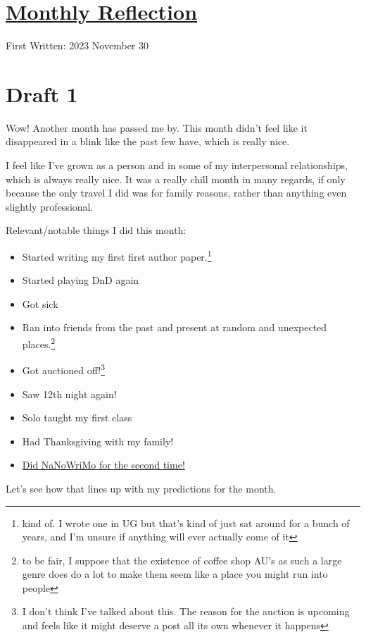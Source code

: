 \documentclass[12pt]{article}[titlepage]
\renewcommand{\,}{\textsuperscript{,}}
\begin{document}
\doublespacing
\section{\href{reflection-november-23.html}{Monthly Reflection}}
First Written: 2023 November 30

\section{Draft 1}
Wow!
Another month has passed me by.
This month didn't feel like it disappeared in a blink like the past few have, which is really nice.
 
I feel like I've grown as a person and in some of my interpersonal relationships, which is always really nice.
It was a really chill month in many regards, if only because the only travel I did was for family reasons, rather than anything even slightly professional.
 
Relevant/notable things I did this month:
\begin{itemize}
\item Started writing my first first author paper.\footnote{kind of. I wrote one in UG but that's kind of just sat around for a bunch of years, and I'm unsure if anything will ever actually come of it}
\item Started playing DnD again
\item Got sick
\item Ran into friends from the past and present at random and unexpected places.\footnote{to be fair, I suppose that the existence of coffee shop AU's as such a large genre does do a lot to make them seem like a place you might run into people}
\item Got auctioned off!\footnote{I don't think I've talked about this. The reason for the auction is upcoming and feels like it might deserve a post all its own whenever it happens}
\item Saw 12th night again!
\item Solo taught my first class
\item Had Thanksgiving with my family!
\item \href{nanowrimo-6.html}{Did NaNoWriMo for the second time!}
\end{itemize}
 
Let's see how that lines up with my predictions for the month.
 
\end{document}
